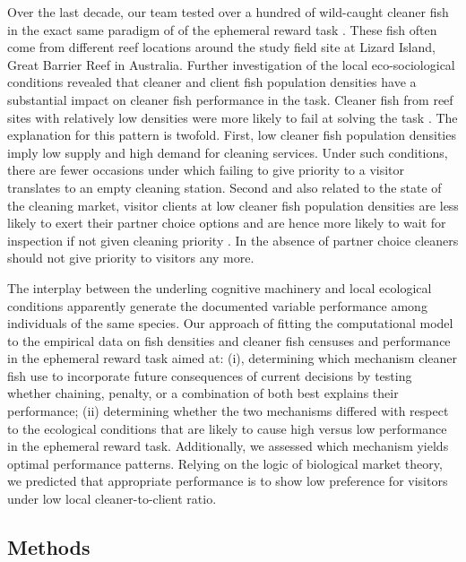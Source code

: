 \documentclass[]{rsos}%
\begin{document}
Over the last decade, our team tested over a hundred of wild-caught
cleaner fish in the exact same paradigm of of the ephemeral reward
task \citep{salwiczek_Adult_2012, wismer_Variation_2014, triki_Decrease_2018, triki_Biological_2019, triki_Brain_2020}. These fish often come from
different reef locations around the study field site at Lizard Island,
Great Barrier Reef in Australia. Further investigation of the local
eco-sociological conditions revealed that cleaner and client
fish population densities have a substantial impact on cleaner fish
performance in the task. Cleaner fish from reef sites with relatively
low densities were more likely to fail at solving the task \citep{triki_Biological_2019, triki_Decrease_2018, wismer_Variation_2014}. The explanation for this pattern
is twofold. First, low cleaner fish population densities imply
low supply and high demand for cleaning services.
Under such conditions, there are fewer occasions under
which failing to give priority to a visitor translates to an empty
cleaning station. Second and also related to the state of the cleaning market,
visitor clients at low cleaner fish population densities
are less likely to exert their partner choice options
and are hence more likely to wait for inspection if not given cleaning
priority \citep{triki_Brain_2020}. In the absence of partner choice
cleaners should not give priority to visitors any more.

The interplay between the underling cognitive machinery and
local ecological conditions apparently generate the documented variable
performance among individuals of the same species.
Our approach of fitting the computational model to the empirical data on
fish densities and cleaner fish censuses and performance
in the ephemeral reward task aimed at: (i), determining which
mechanism cleaner fish use to incorporate future consequences of current
decisions by testing whether chaining, penalty, or a combination
of both best explains their performance; (ii) determining whether the
two mechanisms differed with respect to the ecological conditions
that are likely to cause high versus low performance in the
ephemeral reward task. Additionally, we assessed which mechanism
yields optimal performance patterns. Relying on the logic of
biological market theory, we predicted
that appropriate performance is to show low preference for visitors under low
local cleaner-to-client ratio.

\hypertarget{methods}{%
\subsection{Methods}\label{methods}}
\end{document}
